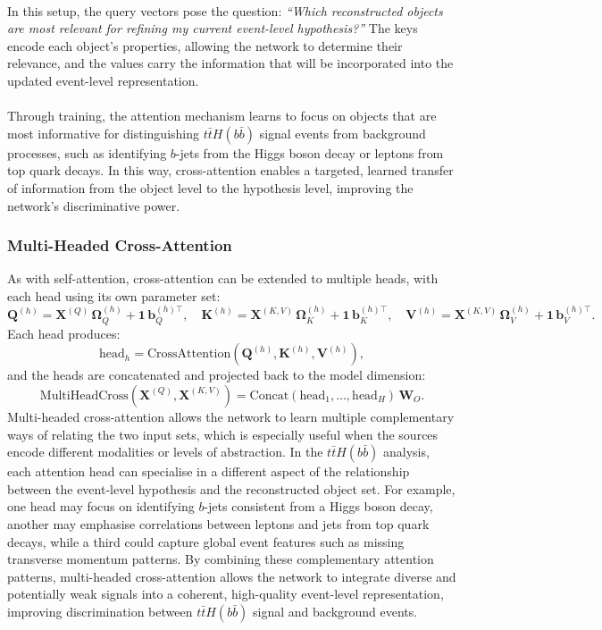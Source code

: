 \\
In this setup, the query vectors pose the question: \emph{``Which reconstructed objects are most relevant for refining my current event-level hypothesis?''} The keys encode each object's properties, allowing the network to determine their relevance, and the values carry the information that will be incorporated into the updated event-level representation.\\
\\
Through training, the attention mechanism learns to focus on objects that are most informative for distinguishing $t\bar{t}H(b\bar{b})$ signal events from background processes, such as identifying $b$-jets from the Higgs boson decay or leptons from top quark decays. In this way, cross-attention enables a targeted, learned transfer of information from the object level to the hypothesis level, improving the network's discriminative power.

\subsubsection{Multi-Headed Cross-Attention}
As with self-attention, cross-attention can be extended to multiple heads, with each head using its own parameter set:
\begin{equation}
\mathbf{Q}^{(h)} = \mathbf{X}^{(Q)} \, \mathbf{\Omega}_Q^{(h)} + \mathbf{1} \, \mathbf{b}_Q^{(h)\top}, \quad
\mathbf{K}^{(h)} = \mathbf{X}^{(K,V)} \, \mathbf{\Omega}_K^{(h)} + \mathbf{1} \, \mathbf{b}_K^{(h)\top}, \quad
\mathbf{V}^{(h)} = \mathbf{X}^{(K,V)} \, \mathbf{\Omega}_V^{(h)} + \mathbf{1} \, \mathbf{b}_V^{(h)\top}.
\end{equation}
Each head produces:
\begin{equation}
\mathrm{head}_h = \mathrm{CrossAttention}\left( \mathbf{Q}^{(h)}, \mathbf{K}^{(h)}, \mathbf{V}^{(h)} \right),
\end{equation}
and the heads are concatenated and projected back to the model dimension:
\begin{equation}
\mathrm{MultiHeadCross}(\mathbf{X}^{(Q)}, \mathbf{X}^{(K,V)}) = \mathrm{Concat}\left(\mathrm{head}_1, \dots, \mathrm{head}_H\right) \, \mathbf{W}_O.
\end{equation}
Multi-headed cross-attention allows the network to learn multiple complementary ways of relating the two input sets, which is especially useful when the sources encode different modalities or levels of abstraction. In the $t\bar{t}H(b\bar{b})$ analysis, each attention head can specialise in a different aspect of the relationship between the event-level hypothesis and the reconstructed object set. For example, one head may focus on identifying $b$-jets consistent from a Higgs boson decay, another may emphasise correlations between leptons and jets from top quark decays, while a third could capture global event features such as missing transverse momentum patterns. By combining these complementary attention patterns, multi-headed cross-attention allows the network to integrate diverse and potentially weak signals into a coherent, high-quality event-level representation, improving discrimination between $t\bar{t}H(b\bar{b})$ signal and background events.
